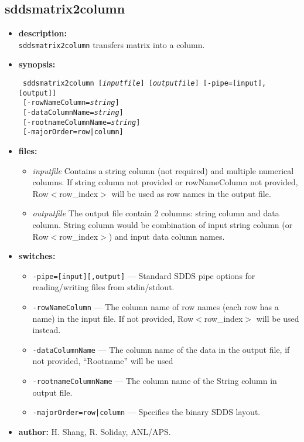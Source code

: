 \newpage 
\subsection{sddsmatrix2column} 
\label{sddsmatrix2column} 
 
\begin{itemize} 
\item {\bf description:} \hspace*{1mm}\\ 
{\tt sddsmatrix2column} transfers matrix into a column.

\item {\bf synopsis:}  
\begin{flushleft}
{\tt 
sddsmatrix2column [{\em inputfile}] [{\em outputfile}] [-pipe=[input],[output]] \\ \
[-rowNameColumn={\em string}] \\ \
[-dataColumnName={\em string}] \\ \
[-rootnameColumnName={\em string}] \\ \
[-majorOrder=row|column]}
\end{flushleft} 

\item {\bf files:}
    \begin{itemize} 
    \item {\em inputfile} Contains a string column (not required) and multiple numerical columns. If string column not provided or rowNameColumn not provided, Row$<$row\_index$>$ will be used as row names in the output file.
    \item {\em outputfile} The output file contain 2 columns: string column and data column. String column would be combination of input string column (or Row$<$row\_index$>$) and input data column names.
    \end{itemize} 

\item {\bf switches:} 
    \begin{itemize} 
    \item {\tt -pipe=[input][,output]} --- Standard SDDS pipe options for reading/writing files from stdin/stdout.
    \item {\tt -rowNameColumn} --- The column name of row names (each row has a name) in the input file. If not provided, Row$<$row\_index$>$ will be used instead. 
    \item {\tt -dataColumnName} --- The column name of the data in the output file, if not provided, ``Rootname'' will be used
    \item {\tt -rootnameColumnName} --- The column name of the String column in output file.
    \item {\tt -majorOrder=row|column} --- Specifies the binary SDDS layout.
    \end{itemize} 

\item {\bf author:} H. Shang, R. Soliday, ANL/APS. 
\end{itemize} 
